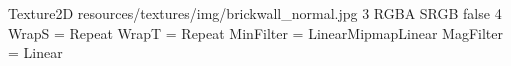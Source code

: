 Texture2D
resources/textures/img/brickwall_normal.jpg
3
RGBA
SRGB
false
4
WrapS = Repeat
WrapT = Repeat
MinFilter = LinearMipmapLinear
MagFilter = Linear
